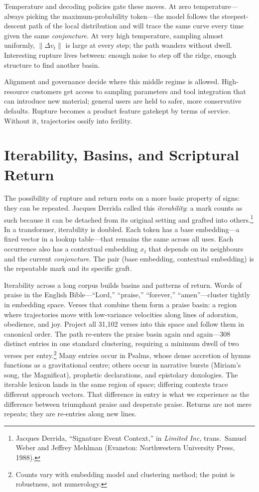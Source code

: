 \documentclass[12pt,a4paper]{article}
\begin{document}
Temperature and decoding policies gate these moves. At zero temperature---always picking the maximum-probability token---the model follows the steepest-descent path of the local distribution and will trace the same curve every time given the same \emph{conjoncture}. At very high temperature, sampling almost uniformly, $\|\Delta v_t\|$ is large at every step; the path wanders without dwell. Interesting rupture lives between: enough noise to step off the ridge, enough structure to find another basin.

Alignment and governance decide where this middle regime is allowed. High-resource customers get access to sampling parameters and tool integration that can introduce new material; general users are held to safer, more conservative defaults. Rupture becomes a product feature gatekept by terms of service. Without it, trajectories ossify into ferility.

\section{Iterability, Basins, and Scriptural Return}

The possibility of rupture and return rests on a more basic property of signs: they can be repeated. Jacques Derrida called this \emph{iterability}: a mark counts as such because it can be detached from its original setting and grafted into others.\footnote{Jacques Derrida, ``Signature Event Context,'' in \emph{Limited Inc}, trans.\ Samuel Weber and Jeffrey Mehlman (Evanston: Northwestern University Press, 1988).} In a transformer, iterability is doubled. Each token has a base embedding---a fixed vector in a lookup table---that remains the same across all uses. Each occurrence also has a contextual embedding $x_t$ that depends on its neighbours and the current \emph{conjoncture}. The pair (base embedding, contextual embedding) is the repeatable mark and its specific graft.

Iterability across a long corpus builds basins and patterns of return. Words of praise in the English Bible---``Lord,'' ``praise,'' ``forever,'' ``amen''---cluster tightly in embedding space. Verses that combine them form a praise basin: a region where trajectories move with low-variance velocities along lines of adoration, obedience, and joy. Project all 31{,}102 verses into this space and follow them in canonical order. The path re-enters the praise basin again and again---308 distinct entries in one standard clustering, requiring a minimum dwell of two verses per entry.\footnote{Counts vary with embedding model and clustering method; the point is robustness, not numerology.} Many entries occur in Psalms, whose dense accretion of hymns functions as a gravitational centre; others occur in narrative bursts (Miriam's song, the Magnificat), prophetic declarations, and epistolary doxologies. The iterable lexicon lands in the same region of space; differing contexts trace different approach vectors. That difference in entry is what we experience as the difference between triumphant praise and desperate praise. Returns are not mere repeats; they are re-entries along new lines.
\end{document}
